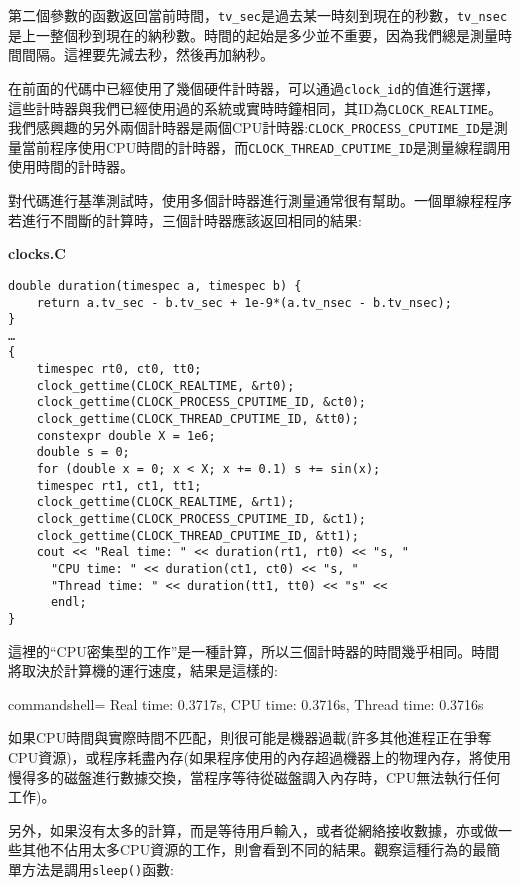 第二個參數的函數返回當前時間，\texttt{tv\_sec}是過去某一時刻到現在的秒數，\texttt{tv\_nsec}是上一整個秒到現在的納秒數。時間的起始是多少並不重要，因為我們總是測量時間間隔。這裡要先減去秒，然後再加納秒。

在前面的代碼中已經使用了幾個硬件計時器，可以通過\texttt{clock\_id}的值進行選擇，這些計時器與我們已經使用過的系統或實時時鐘相同，其ID為\texttt{CLOCK\_REALTIME}。我們感興趣的另外兩個計時器是兩個CPU計時器:\texttt{CLOCK\_PROCESS\_CPUTIME\_ID}是測量當前程序使用CPU時間的計時器，而\texttt{CLOCK\_THREAD\_CPUTIME\_ID}是測量線程調用使用時間的計時器。

對代碼進行基準測試時，使用多個計時器進行測量通常很有幫助。一個單線程程序若進行不間斷的計算時，三個計時器應該返回相同的結果:

\noindent
\textbf{clocks.C}
\begin{lstlisting}[style=styleCXX]
double duration(timespec a, timespec b) {
	return a.tv_sec - b.tv_sec + 1e-9*(a.tv_nsec - b.tv_nsec);
}
…
{
	timespec rt0, ct0, tt0;
	clock_gettime(CLOCK_REALTIME, &rt0);
	clock_gettime(CLOCK_PROCESS_CPUTIME_ID, &ct0);
	clock_gettime(CLOCK_THREAD_CPUTIME_ID, &tt0);
	constexpr double X = 1e6;
	double s = 0;
	for (double x = 0; x < X; x += 0.1) s += sin(x);
	timespec rt1, ct1, tt1;
	clock_gettime(CLOCK_REALTIME, &rt1);
	clock_gettime(CLOCK_PROCESS_CPUTIME_ID, &ct1);
	clock_gettime(CLOCK_THREAD_CPUTIME_ID, &tt1);
	cout << "Real time: " << duration(rt1, rt0) << "s, "
	  "CPU time: " << duration(ct1, ct0) << "s, "
	  "Thread time: " << duration(tt1, tt0) << "s" <<
	  endl;
}
\end{lstlisting}

這裡的“CPU密集型的工作”是一種計算，所以三個計時器的時間幾乎相同。時間將取決於計算機的運行速度，結果是這樣的:

\begin{tcblisting}{commandshell={}}
Real time: 0.3717s, CPU time: 0.3716s, Thread time: 0.3716s
\end{tcblisting}

如果CPU時間與實際時間不匹配，則很可能是機器過載(許多其他進程正在爭奪CPU資源)，或程序耗盡內存(如果程序使用的內存超過機器上的物理內存，將使用慢得多的磁盤進行數據交換，當程序等待從磁盤調入內存時，CPU無法執行任何工作)。

另外，如果沒有太多的計算，而是等待用戶輸入，或者從網絡接收數據，亦或做一些其他不佔用太多CPU資源的工作，則會看到不同的結果。觀察這種行為的最簡單方法是調用\texttt{sleep()}函數:

